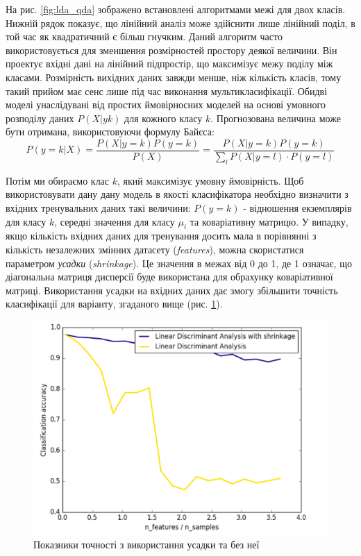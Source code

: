 На рис. \ref{fig:lda_qda} зображено встановлені алгоритмами межі для двох класів. Нижній рядок показує, що лінійний аналіз може здійснити лише лінійний поділ, в той час як квадратичний є більш гнучким. Даний алгоритм часто використовується для зменшення розмірностей простору деякої величини. Він проектує вхідні дані на лінійний підпростір, що максимізує межу поділу між класами. Розмірність вихідних даних завжди менше, ніж кількість класів, тому такий прийом має сенс лише під час виконання мультикласифікації. Обидві моделі унаслідувані від простих ймовірносних моделей на основі умовного розподілу даних $P(X|y  k)$ для кожного класу $k$. Прогнозована величина може бути отримана, використовуючи формулу Байєса:
\begin{equation}
    \label{eq:logistic_regression}
    P(y = k|X) = \frac{P(X|y = k)P(y=k)}{P(X)} = \frac{P(X|y = k)P(y = k)}{\sum_{l}P(X|y=l) \cdot P(y=l)}
\end{equation}

Потім ми обираємо клас $k$, який максимізує умовну ймовірність. Щоб використовувати дану дану модель в якості класифікатора необхідно визначити з вхідних тренувальних даних такі величини: $P(y=k)$ - відношення екземплярів для класу $k$, середні значення для класу $\mu_{i}$ та коваріативну матрицю. У випадку, якщо кількість вхідних даних для тренування досить мала в порівнянні з кількість незалежних змінних датасету (\textit{features}), можна скористатися параметром \textit{усадки} (\textit{shrinkage}). Це значення в межах від 0 до 1, де 1 означає, що діагональна матриця дисперсії буде використана для обрахунку коваріативної матриці. Використання усадки на вхідних даних дає змогу збільшити точність класифікації для варіанту, згаданого вище (рис. \ref{fig:shrinkage}).

\begin{figure}[h!]
  \includegraphics[width=\linewidth]{figures/shrinkage.png}
  \caption{Показники точності з використання усадки та без неї}
  \label{fig:shrinkage}
\end{figure}

